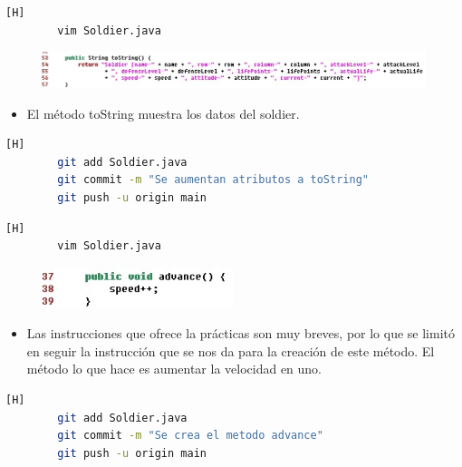 \documentclass{article}
\begin{document}
	
	\begin{lstlisting}[language=bash,caption={Se crea un método que nos muestre los datos de un Soldier }][H]
		vim Soldier.java
	\end{lstlisting}
	
	\begin{figure}[H]
		\centering
		\includegraphics[width=1\textwidth,keepaspectratio]{img/toString.jpg}
	\end{figure}
	
	\begin{itemize}	
		\item El método toString muestra los datos del soldier.
	\end{itemize}
	
	\begin{lstlisting}[language=bash,caption={Commit: 4ca2b91b8555fdaa32a7abd4c96c4803e64602dd7 }][H]
		git add Soldier.java
		git commit -m "Se aumentan atributos a toString"			
		git push -u origin main
	\end{lstlisting}
	
	
	
	\begin{lstlisting}[language=bash,caption={Se crea el metodo avanzar}][H]
		vim Soldier.java
	\end{lstlisting}
	
	\begin{figure}[H]
		\centering
		\includegraphics[width=0.5\textwidth,keepaspectratio]{img/advance.jpg}
	\end{figure}
	
	\begin{itemize}	
		\item Las instrucciones que ofrece la prácticas son muy breves, por lo que se limitó en seguir la instrucción que se nos da para la creación de este método. El método lo que hace es aumentar la velocidad en uno.
	\end{itemize}
	
	\begin{lstlisting}[language=bash,caption={Commit: f024c49ff16d97ebf6611820a92ef6af6587f67c }][H]
		git add Soldier.java
		git commit -m "Se crea el metodo advance"			
		git push -u origin main
	\end{lstlisting}
	
\end{document}
